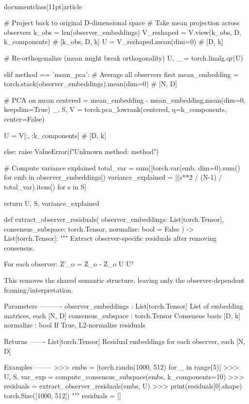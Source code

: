 \\documentclass[11pt]{article}
\begin{document}
\begin{CodeBlock}
        # Project back to original D-dimensional space
        # Take mean projection across observers
        k_obs = len(observer_embeddings)
        V_reshaped = V.view(k_obs, D, k_components)  # [k_obs, D, k]
        U = V_reshaped.mean(dim=0)  # [D, k]
        
        # Re-orthogonalize (mean might break orthogonality)
        U, _ = torch.linalg.qr(U)
        
    elif method == 'mean_pca':
        # Average all observers first
        mean_embedding = torch.stack(observer_embeddings).mean(dim=0)  # [N, D]
        
        # PCA on mean
        centered = mean_embedding - mean_embedding.mean(dim=0, keepdim=True)
        _, S, V = torch.pca_lowrank(centered, q=k_components, center=False)
        
        U = V[:, :k_components]  # [D, k]
    
    else:
        raise ValueError(f"Unknown method: {method}")
    
    # Compute variance explained
    total_var = sum([torch.var(emb, dim=0).sum() for emb in observer_embeddings])
    variance_explained = [(s**2 / (N-1) / total_var).item() for s in S]
    
    return U, S, variance_explained


def extract_observer_residuals(
    observer_embeddings: List[torch.Tensor],
    consensus_subspace: torch.Tensor,
    normalize: bool = False
) -> List[torch.Tensor]:
    """
    Extract observer-specific residuals after removing consensus.
    
    For each observer: Z'_o = Z_o - Z_o U Uᵀ
    
    This removes the shared semantic structure, leaving only the
    observer-dependent framing/interpretation.
    
    Parameters
    ----------
    observer_embeddings : List[torch.Tensor]
        List of embedding matrices, each [N, D]
    consensus_subspace : torch.Tensor
        Consensus basis [D, k]
    normalize : bool
        If True, L2-normalize residuals
    
    Returns
    -------
    List[torch.Tensor]
        Residual embeddings for each observer, each [N, D]
    
    Examples
    --------
    >>> embs = [torch.randn(1000, 512) for _ in range(5)]
    >>> U, S, var_exp = compute_consensus_subspace(embs, k_components=10)
    >>> residuals = extract_observer_residuals(embs, U)
    >>> print(residuals[0].shape)
    torch.Size([1000, 512])
    """
    residuals = []
    

\end{CodeBlock}
\end{document}
